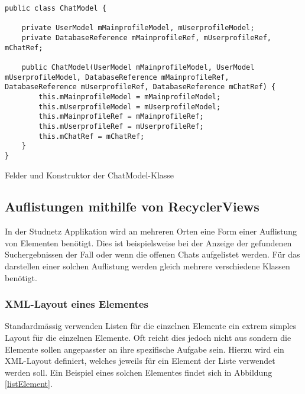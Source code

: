 \documentclass[../main.tex]{subfiles}
\begin{document}
\begin{code}
	\begin{center}
		\begin{verbatim}
public class ChatModel {

	private UserModel mMainprofileModel, mUserprofileModel;
	private DatabaseReference mMainprofileRef, mUserprofileRef, mChatRef;

	public ChatModel(UserModel mMainprofileModel, UserModel mUserprofileModel, DatabaseReference mMainprofileRef, DatabaseReference mUserprofileRef, DatabaseReference mChatRef) {
		this.mMainprofileModel = mMainprofileModel;
		this.mUserprofileModel = mUserprofileModel;
		this.mMainprofileRef = mMainprofileRef;
		this.mUserprofileRef = mUserprofileRef;
		this.mChatRef = mChatRef;
	}
}

		\end{verbatim}
		\caption{Felder und Konstruktor der ChatModel-Klasse}
		\label{chatModelConst}
	\end{center}
	
\end{code}
		
	\subsection{Auflistungen mithilfe von RecyclerViews}
	In der Studnetz Applikation wird an mehreren Orten eine Form einer Auflistung von Elementen benötigt. Dies ist beispielsweise bei der Anzeige der gefundenen Suchergebnissen der Fall oder wenn die offenen Chats aufgelistet werden. Für das darstellen einer solchen Auflistung werden gleich mehrere verschiedene Klassen benötigt.
	
	\subsubsection{XML-Layout eines Elementes}
	Standardmässig verwenden Listen für die einzelnen Elemente ein extrem simples Layout für die einzelnen Elemente. Oft reicht dies jedoch nicht aus sondern die Elemente sollen angepasster an ihre spezifische Aufgabe sein. Hierzu wird ein XML-Layout definiert, welches jeweils für ein Element der Liste verwendet werden soll. Ein Beispiel eines solchen Elementes findet sich in Abbildung \ref{listElement}.
\end{document}
